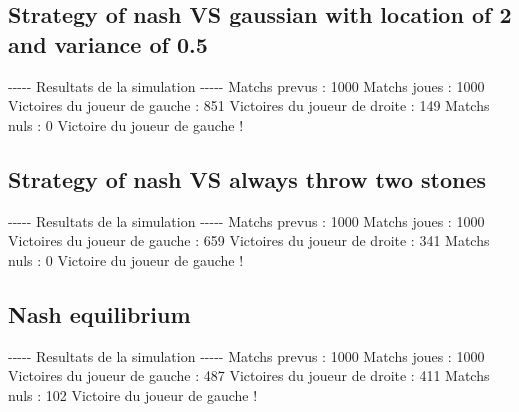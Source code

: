 \documentclass{article}%
\begin{document}
%
\subsection{Strategy of nash VS gaussian with location of 2 and variance of 0.5}%
\label{subsec:Strategy of nash VS gaussian with location of 2 and variance of 0.5}%
{-}{-}{-}{-}{-} Resultats de la simulation {-}{-}{-}{-}{-}\newline%
		\newline%
Matchs prevus : 1000\newline%
Matchs joues : 1000\newline%
\newline%
Victoires du joueur de gauche : 851\newline%
Victoires du joueur de droite : 149\newline%
Matchs nuls : 0\newline%
\newline%
Victoire du joueur de gauche !

%
\subsection{Strategy of nash VS always throw two stones}%
\label{subsec:Strategy of nash VS always throw two stones}%
{-}{-}{-}{-}{-} Resultats de la simulation {-}{-}{-}{-}{-}\newline%
		\newline%
Matchs prevus : 1000\newline%
Matchs joues : 1000\newline%
\newline%
Victoires du joueur de gauche : 659\newline%
Victoires du joueur de droite : 341\newline%
Matchs nuls : 0\newline%
\newline%
Victoire du joueur de gauche !

%
\subsection{Nash equilibrium}%
\label{subsec:Nash equilibrium}%
{-}{-}{-}{-}{-} Resultats de la simulation {-}{-}{-}{-}{-}\newline%
		\newline%
Matchs prevus : 1000\newline%
Matchs joues : 1000\newline%
\newline%
Victoires du joueur de gauche : 487\newline%
Victoires du joueur de droite : 411\newline%
Matchs nuls : 102\newline%
\newline%
Victoire du joueur de gauche !
\end{document}
